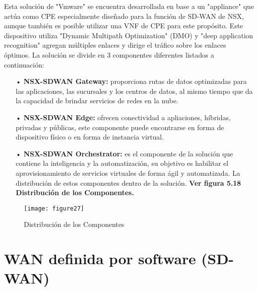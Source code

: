 Esta solución de "Vmware" se encuentra desarrollada en base a un "appliance" que actúa como CPE especialmente diseñado para la función de SD-WAN de NSX, aunque también es posible utilizar una VNF de CPE para este propósito. Este dispositivo utiliza "Dynamic Multipath Optimization" (DMO) y "deep application recognition" agregan múltiples enlaces y dirige el tráfico sobre los enlaces óptimos. La solución se divide en
3 componentes diferentes listados a continuación:

\begin{itemize}
 
\item[•]\textbf{NSX-SDWAN Gateway:} proporciona rutas de datos optimizadas para las aplicaciones, las sucursales y los centros de datos, al mismo tiempo que da la capacidad de brindar servicios de redes en la nube.
\item[•]\textbf{NSX-SDWAN Edge:} ofrecen conectividad a apliaciones, híbridas, privadas y públicas, este componente puede encontrarse en forma de dispositivo físico o en forma de instancia virtual.
\item[•]\textbf{NSX-SDWAN Orchestrator:} es el componente de la solución que contiene la inteligencia y la automatización, su objetivo es habilitar el aprovisionamiento de servicios virtuales de forma ágil y automatizada. La distribución de estos componentes dentro de la solución.
\textbf{Ver figura 5.18 Distribución de los Componentes.}
\end{itemize}

\begin{figure}[htbp]
  \centering
    {\texttt{[image: figure27]}}%
  \caption{Distribución de los Componentes}
  \label{fig:fig2subfig}
\end{figure}

\section{WAN definida por software (SD-WAN)}
\label{WAN definida por software (SD-WAN)}

